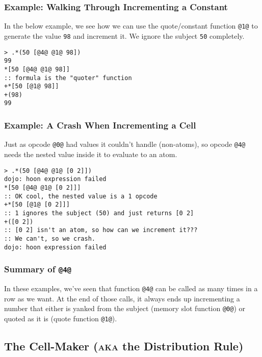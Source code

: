 \documentclass[twoside]{article}
\begin{document}
\subsubsection{Example:  Walking Through Incrementing a Constant}

In the below example, we see how we can use the quote/constant function \lstinline[style=inlinecode]{@1@} to generate the value \lstinline[style=inlinecode]{98} and increment it. We ignore the subject \lstinline[style=inlinecode]{50} completely.

\begin{lstlisting}[style=listingcode]
> .*(50 [@4@ @1@ 98])
99
*[50 [@4@ @1@ 98]]
:: formula is the "quoter" function
+*[50 [@1@ 98]]
+(98)
99
\end{lstlisting}

\subsubsection{Example:  A Crash When Incrementing a Cell}

Just as opcode \lstinline[style=inlinecode]{@0@} had values it couldn't handle (non-atoms), so opcode \lstinline[style=inlinecode]{@4@} needs the nested value inside it to evaluate to an atom.

\begin{lstlisting}[style=listingcode]
> .*(50 [@4@ @1@ [0 2]])
dojo: hoon expression failed
*[50 [@4@ @1@ [0 2]]]
:: OK cool, the nested value is a 1 opcode
+*[50 [@1@ [0 2]]]
:: 1 ignores the subject (50) and just returns [0 2]
+([0 2])
:: [0 2] isn't an atom, so how can we increment it???
:: We can't, so we crash.
dojo: hoon expression failed
\end{lstlisting}

\subsubsection{Summary of \lstinline[style=inlinecode]{@4@}}

In these examples, we've seen that function \lstinline[style=inlinecode]{@4@} can be called as many times in a row as we want. At the end of those calls, it always ends up incrementing a number that either is yanked from the subject (memory slot function \lstinline[style=inlinecode]{@0@}) or quoted as it is (quote function \lstinline[style=inlinecode]{@1@}).

\subsection{The Cell-Maker (\textsc{aka} the Distribution Rule)}
\label{sxn:nockdist}
\end{document}
